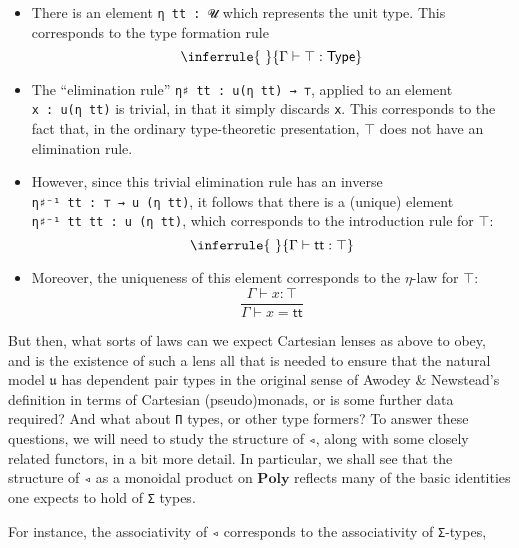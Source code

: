\documentclass[
  11pt,
  oneside,
  article]{memoir}
\providecommand{\tightlist}{%
  \setlength{\itemsep}{0pt}\setlength{\parskip}{0pt}}
\theoremstyle{definition}
\theoremstyle{plain}
\newcommand{\0}{\textsf{0}}
\newcommand{\1}{\tn{\textsf{1}}}
\begin{document}
\begin{itemize}
\tightlist
\item
  There is an element \texttt{η\ tt\ :\ 𝓤} which represents the unit
  type. This corresponds to the type formation rule
  \[ \inferrule{~}{\Gamma \vdash \top : \mathsf{Type}}\]
\item
  The ``elimination rule'' \texttt{η♯\ tt\ :\ u(η\ tt)\ →\ ⊤}, applied
  to an element \texttt{x\ :\ u(η\ tt)} is trivial, in that it simply
  discards \texttt{x}. This corresponds to the fact that, in the
  ordinary type-theoretic presentation, \(\top\) does not have an
  elimination rule.
\item
  However, since this trivial elimination rule has an inverse
  \texttt{η♯⁻¹\ tt\ :\ ⊤\ →\ u\ (η\ tt)}, it follows that there is a
  (unique) element \texttt{η♯⁻¹\ tt\ tt\ :\ u\ (η\ tt)}, which
  corresponds to the introduction rule for \(\top\):
  \[\inferrule{~}{\Gamma \vdash \mathsf{tt} : \top}\]
\item
  Moreover, the uniqueness of this element corresponds to the
  \(\eta\)-law for \(\top\):
  \[\frac{\Gamma \vdash x : \top}{\Gamma \vdash x = \mathsf{tt}}\]
\end{itemize}

But then, what sorts of laws can we expect Cartesian lenses as above to
obey, and is the existence of such a lens all that is needed to ensure
that the natural model \(𝔲\) has dependent pair types in the original
sense of Awodey \& Newstead's definition in terms of Cartesian
(pseudo)monads, or is some further data required? And what about
\texttt{Π} types, or other type formers? To answer these questions, we
will need to study the structure of \texttt{◃}, along with some closely
related functors, in a bit more detail. In particular, we shall see that
the structure of \texttt{◃} as a monoidal product on \(\mathbf{Poly}\)
reflects many of the basic identities one expects to hold of \texttt{Σ}
types.

For instance, the associativity of \texttt{◃} corresponds to the
associativity of \texttt{Σ}-types,
\end{document}
